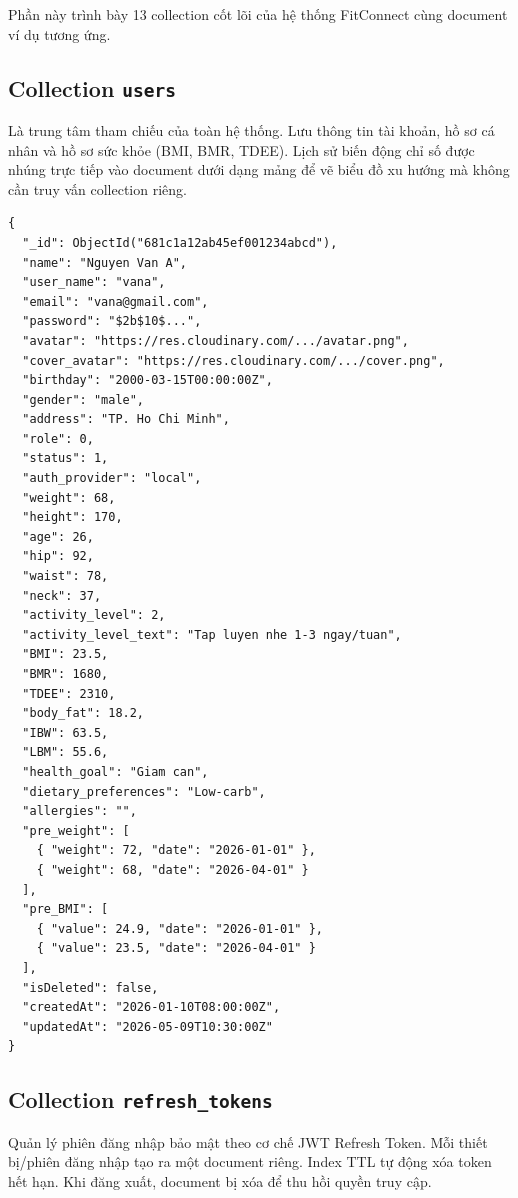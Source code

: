 Phần này trình bày 13 collection cốt lõi của hệ thống FitConnect cùng document ví dụ tương ứng.

\subsection{Collection \texttt{users}}
\label{subsec:col_users}

Là trung tâm tham chiếu của toàn hệ thống. Lưu thông tin tài khoản, hồ sơ cá nhân và hồ sơ sức khỏe (BMI, BMR, TDEE). Lịch sử biến động chỉ số được nhúng trực tiếp vào document dưới dạng mảng để vẽ biểu đồ xu hướng mà không cần truy vấn collection riêng.

\begin{verbatim}
{
  "_id": ObjectId("681c1a12ab45ef001234abcd"),
  "name": "Nguyen Van A",
  "user_name": "vana",
  "email": "vana@gmail.com",
  "password": "$2b$10$...",
  "avatar": "https://res.cloudinary.com/.../avatar.png",
  "cover_avatar": "https://res.cloudinary.com/.../cover.png",
  "birthday": "2000-03-15T00:00:00Z",
  "gender": "male",
  "address": "TP. Ho Chi Minh",
  "role": 0,
  "status": 1,
  "auth_provider": "local",
  "weight": 68,
  "height": 170,
  "age": 26,
  "hip": 92,
  "waist": 78,
  "neck": 37,
  "activity_level": 2,
  "activity_level_text": "Tap luyen nhe 1-3 ngay/tuan",
  "BMI": 23.5,
  "BMR": 1680,
  "TDEE": 2310,
  "body_fat": 18.2,
  "IBW": 63.5,
  "LBM": 55.6,
  "health_goal": "Giam can",
  "dietary_preferences": "Low-carb",
  "allergies": "",
  "pre_weight": [
    { "weight": 72, "date": "2026-01-01" },
    { "weight": 68, "date": "2026-04-01" }
  ],
  "pre_BMI": [
    { "value": 24.9, "date": "2026-01-01" },
    { "value": 23.5, "date": "2026-04-01" }
  ],
  "isDeleted": false,
  "createdAt": "2026-01-10T08:00:00Z",
  "updatedAt": "2026-05-09T10:30:00Z"
}
\end{verbatim}

\subsection{Collection \texttt{refresh\_tokens}}
\label{subsec:col_refresh_tokens}

Quản lý phiên đăng nhập bảo mật theo cơ chế JWT Refresh Token. Mỗi thiết bị/phiên đăng nhập tạo ra một document riêng. Index TTL tự động xóa token hết hạn. Khi đăng xuất, document bị xóa để thu hồi quyền truy cập.

